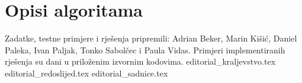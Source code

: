 \documentclass[a4paper]{article}
\date{July 29th 2020.}
\begin{document}
\section*{Opisi algoritama}
Zadatke, testne primjere i rješenja pripremili: Adrian Beker, Marin Kišić,
Daniel Paleka, Ivan Paljak, Tonko Sabolčec i Paula Vidas.
Primjeri implementiranih rješenja su dani u priloženim izvornim kodovima.
{editorial_kraljevstvo.tex}
\clearpage
{editorial_redoslijed.tex}
\clearpage
{editorial_sadnice.tex}
\clearpage
\end{document}
